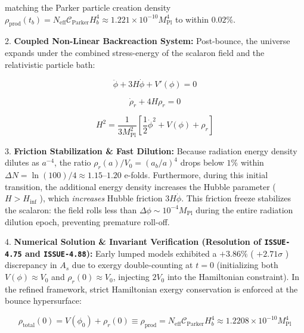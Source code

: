 \documentclass[11pt,a4paper]{article}
\theoremstyle{definition}
\theoremstyle{remark}
\begin{document}
matching the Parker particle creation density $\rho_{\text{prod}}(t_b) = N_{\text{eff}} \mathcal{C}_{\text{Parker}} H_b^4 \approx 1.221 \times 10^{-10} M_{\text{Pl}}^4$ to within $0.02\%$.

2. \textbf{Coupled Non-Linear Backreaction System:}
Post-bounce, the universe expands under the combined stress-energy of the scalaron field and the relativistic particle bath:


\begin{equation}
\ddot{\phi} + 3H\dot{\phi} + V'(\phi) = 0
\end{equation}



\begin{equation}
\dot{\rho}_r + 4H\rho_r = 0
\end{equation}



\begin{equation}
H^2 = \frac{1}{3 M_{\text{Pl}}^2} \left[ \frac{1}{2}\dot{\phi}^2 + V(\phi) + \rho_r \right]
\end{equation}


3. \textbf{Friction Stabilization \& Fast Dilution:}
Because radiation energy density dilutes as $a^{-4}$, the ratio $\rho_r(a) / V_0 = (a_b / a)^4$ drops below $1\%$ within $\Delta N = \ln(100)/4 \approx 1.15\text{--}1.20$ e-folds. Furthermore, during this initial transition, the additional energy density increases the Hubble parameter ( $H > H_{\text{inf}}$ ), which \textit{increases} Hubble friction $3H\dot{\phi}$. This friction freeze stabilizes the scalaron: the field rolls less than $\Delta\phi \sim 10^{-4} M_{\text{Pl}}$ during the entire radiation dilution epoch, preventing premature roll-off.

4. \textbf{Numerical Solution \& Invariant Verification (Resolution of \texttt{ISSUE-4.75} and \texttt{ISSUE-4.88}):}
Early lumped models exhibited a $+3.86\%$ ( $+2.71\sigma$ ) discrepancy in $A_s$ due to exergy double-counting at $t=0$ (initializing both $V(\phi) \approx V_0$ and $\rho_r(0) \approx V_0$, injecting $2V_0$ into the Hamiltonian constraint).
In the refined framework, strict Hamiltonian exergy conservation is enforced at the bounce hypersurface:


\begin{equation}
\rho_{\text{total}}(0) = V(\phi_0) + \rho_r(0) \equiv \rho_{\text{prod}} = N_{\text{eff}} \mathcal{C}_{\text{Parker}} H_b^4 \approx 1.2208 \times 10^{-10} M_{\text{Pl}}^4
\end{equation}
\end{document}

